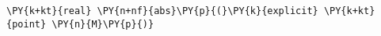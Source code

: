 \begin{Verbatim}[commandchars=\\\{\}]
    \PY{k+kt}{real} \PY{n+nf}{abs}\PY{p}{(}\PY{k}{explicit} \PY{k+kt}{point} \PY{n}{M}\PY{p}{)}
\end{Verbatim}

